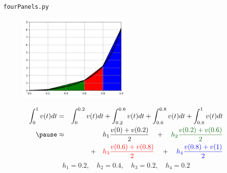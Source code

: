 \documentclass[english,14pt]{beamer}
\newcommand\red[1]{{\color{red} #1}}
\newcommand\blue[1]{{\color{blue} #1}}
\newcommand\darkGreen[1]{{\color{darkGreen} #1}}
\begin{document}

\begin{frame}[fragile]

\frametitle{}

\vspace*{-1mm}
{\footnotesize
\texttt{fourPanels.py}}
\vspace*{-3mm}
\begin{figure}[ht]
	\centering
	\includegraphics[width=0.5\textwidth]{figures/fourPanel}
\end{figure}
\vspace*{-5mm}
{\small
\begin{eqnarray*}
\int_0^1 v(t)dt & = & \int_0^{0.2} v(t)dt + \int_{0.2}^{0.6} v(t)dt + \int_{0.6}^{0.8} v(t)dt + \int_{0.8}^1 v(t)dt \\
\pause
&\approx & h_1 \frac{v(0) + v(0.2)}{2} \quad+\quad \darkGreen{h_2 \frac{v(0.2) + v(0.6)}{2}} \\
& & \quad+\quad \red{h_3 \frac{v(0.6) + v(0.8)}{2}} \quad+\quad \blue{h_4 \frac{v(0.8) + v(1)}{2}} 
\end{eqnarray*}
}
\pause
\vspace*{-5mm}
\[
h_1 = 0.2, \quad h_2 = 0.4, \quad h_3 = 0.2, \quad h_4 = 0.2
\]

\end{frame}

\end{document}
